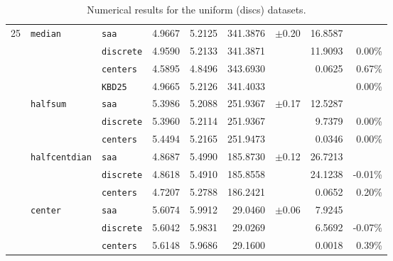 \documentclass[letter,11pt, reqno]{amsart}
\renewcommand{\;}{\quad}
\theoremstyle{thmstyleone}%
\theoremstyle{thmstyletwo}%
\theoremstyle{thmstylethree}%
\begin{document}
\begin{table}[h!]
\begin{adjustbox}{width=0.65\textwidth}
\begin{tabular}{@{} c l l c c r l r r @{}}
\midrule
{25}
 & {\texttt{median}}
   & \texttt{saa}      & 4.9667 & 5.2125 & 341.3876& $\pm$0.20 & 16.8587 & {} \\
 & & \texttt{discrete} & 4.9590 & 5.2133 & 341.3871& {}        & 11.9093 & 0.00\% \\
 & & \texttt{centers}  & 4.5895 & 4.8496 & 343.6930& {}        & 0.0625  & 0.67\% \\
 & & \texttt{KBD25}    & 4.9665 & 5.2126 & 341.4033& {}        & {}      & 0.00\% \\[2pt]
 & {\texttt{halfsum}}
   & \texttt{saa}      & 5.3986 & 5.2088 & 251.9367& $\pm$0.17 & 12.5287 & {} \\
 & & \texttt{discrete} & 5.3960 & 5.2114 & 251.9367& {}        & 9.7379  & 0.00\% \\
 & & \texttt{centers}  & 5.4494 & 5.2165 & 251.9473& {}        & 0.0346  & 0.00\% \\[2pt]
 & {\texttt{halfcentdian}}
   & \texttt{saa}      & 4.8687 & 5.4990 & 185.8730& $\pm$0.12 & 26.7213 & {} \\
 & & \texttt{discrete} & 4.8618 & 5.4910 & 185.8558& {}        & 24.1238 & -0.01\% \\
 & & \texttt{centers}  & 4.7207 & 5.2788 & 186.2421& {}        & 0.0652  & 0.20\% \\[2pt]
 & {\texttt{center}}
   & \texttt{saa}      & 5.6074 & 5.9912 & 29.0460 & $\pm$0.06 & 7.9245  & {} \\
 & & \texttt{discrete} & 5.6042 & 5.9831 & 29.0269 & {}        & 6.5692  & -0.07\% \\
 & & \texttt{centers}  & 5.6148 & 5.9686 & 29.1600 & {}        & 0.0018  & 0.39\% \\
\bottomrule
\end{tabular}
\end{adjustbox}
\caption{Numerical results for the uniform (discs) datasets.}
\label{tab:uniform_updated}
\end{table}
\end{document}
